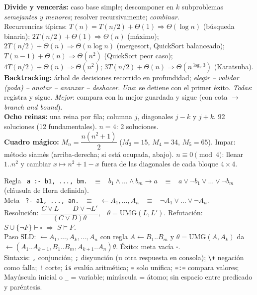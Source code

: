 \begin{formulario}
\textbf{Divide y vencerás:} caso base simple; descomponer en $k$ subproblemas \emph{semejantes y menores}; resolver recursivamente; \emph{combinar}.\\
Recurrencias típicas: $T(n)=T(n/2)+\Theta(1)\Rightarrow\Theta(\log n)$ (búsqueda binaria); $2T(n/2)+\Theta(1)\Rightarrow\Theta(n)$ (máximo); $2T(n/2)+\Theta(n)\Rightarrow\Theta(n\log n)$ (mergesort, QuickSort balanceado); $T(n-1)+\Theta(n)\Rightarrow\Theta(n^2)$ (QuickSort peor caso); $4T(n/2)+\Theta(n)\Rightarrow\Theta(n^2)$; $3T(n/2)+\Theta(n)\Rightarrow\Theta(n^{\log_2 3})$ (Karatsuba).\\[3pt]
\textbf{Backtracking:} árbol de decisiones recorrido en profundidad; \emph{elegir – validar (poda) – anotar – avanzar – deshacer}. \emph{Una}: se detiene con el primer éxito. \emph{Todas}: registra y sigue. \emph{Mejor}: compara con la mejor guardada y sigue (con cota $\to$ \emph{branch and bound}).\\[3pt]
\textbf{Ocho reinas:} una reina por fila; columna $j$, diagonales $j-k$ y $j+k$. 92 soluciones (12 fundamentales). $n=4$: 2 soluciones.\\
\textbf{Cuadro mágico:} $M_n=\dfrac{n(n^2+1)}{2}$ ($M_3=15$, $M_4=34$, $M_5=65$). Impar: método siamés (arriba-derecha; si está ocupada, abajo). $n\equiv0\pmod 4$: llenar $1..n^2$ y cambiar $x\mapsto n^2+1-x$ fuera de las diagonales de cada bloque $4\times4$.
\end{formulario}

\begin{formulario}
Regla \ \texttt{a :- b1, ..., bm.} \ $\equiv$ \ $b_1\land\dots\land b_m\to a$ \ $\equiv$ \ $a\lor\neg b_1\lor\dots\lor\neg b_m$ (cláusula de Horn definida).\\
Meta \ \texttt{?- a1, ..., an.} \ $\equiv$ \ $\leftarrow A_1,\dots,A_n$ \ $\equiv$ \ $\neg A_1\lor\dots\lor\neg A_n$.\\
Resolución: $\dfrac{C\lor L\qquad D\lor\neg L'}{(C\lor D)\theta}$,\ \ $\theta=\mathrm{UMG}(L,L')$. Refutación: $S\cup\{\neg F\}\vdash\square\;\Rightarrow\;S\models F$.\\
Paso SLD: $\leftarrow A_1,\dots,A_k,\dots,A_n$ con regla $A\leftarrow B_1..B_m$ y $\theta=\mathrm{UMG}(A,A_k)$ da $\leftarrow(A_1..A_{k-1},B_1..B_m,A_{k+1}..A_n)\theta$. Éxito: meta vacía $\square$.\\
Sintaxis: \texttt{,} conjunción; \texttt{;} disyunción (u otra respuesta en consola); \texttt{\textbackslash+} negación como falla; \texttt{!} corte; \texttt{is} evalúa aritmética; \texttt{=} solo unifica; \texttt{=:=} compara valores; Mayúscula inicial o \texttt{\_} = variable; minúscula = átomo; sin espacio entre predicado y paréntesis.
\end{formulario}

\newpage




